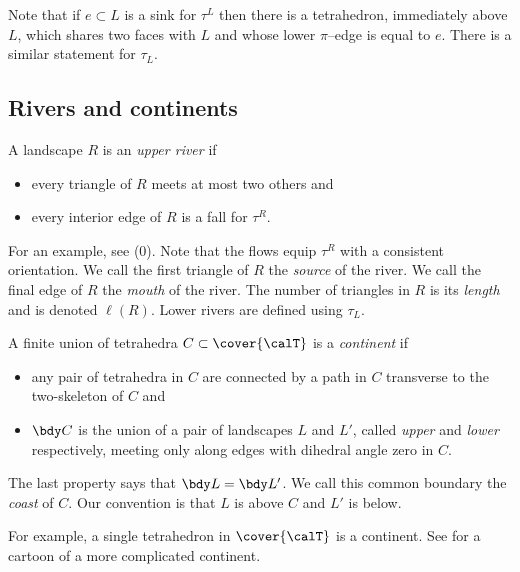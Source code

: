 \documentclass[12pt]{amsart}
\begin{document}
\begin{remark}
\label{Rem:Sink}
Note that if $e \subset L$ is a sink for $\tau^L$ then there is a tetrahedron, immediately above $L$, which shares two faces with $L$ and whose lower $\pi$--edge is equal to $e$.  There is a similar statement for $\tau_L$. 
\end{remark}

\subsection{Rivers and continents}

\begin{definition}
\label{Def:River}
A landscape $R$ is an \emph{upper river} if 
\begin{itemize}
\item
every triangle of $R$ meets at most two others and 
\item
every interior edge of $R$ is a fall for $\tau^R$. 
\end{itemize}
For an example, see (0).  Note that the flows equip $\tau^R$ with a consistent orientation.
We call the first triangle of $R$ the \emph{source} of the river.  We call the final edge of $R$ the \emph{mouth} of the river.  The number of triangles in $R$ is its \emph{length} and is denoted $\ell(R)$.  Lower rivers are defined using $\tau_L$.
\end{definition}

\begin{definition}
\label{Def:Continent}
A finite union of tetrahedra $C \subset \cover{\calT}$ is a \emph{continent} if 
\begin{itemize}
\item
any pair of tetrahedra in $C$ are connected by a path in $C$ transverse to the two-skeleton of $C$ and 
\item
$\bdy C$ is the union of a pair of landscapes $L$ and $L'$, called \emph{upper} and \emph{lower} respectively, meeting only along edges with dihedral angle zero in $C$.  
\end{itemize}
The last property says that $\bdy L = \bdy L'$.  We call this common boundary the \emph{coast} of $C$.  Our convention is that $L$ is above $C$ and $L'$ is below. 
\end{definition}

\noindent
For example, a single tetrahedron in $\cover{\calT}$ is a continent.  See  for a cartoon of a more complicated continent.  
\end{document}
